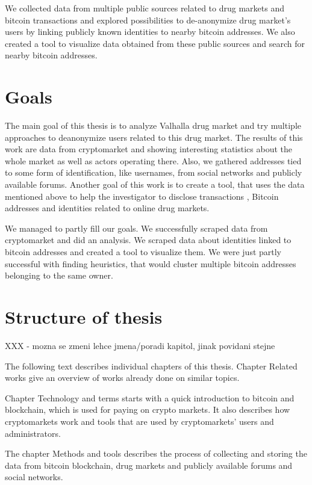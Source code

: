 \documentclass[
  digital, %
  table,   %
  lof,     %
  lot,     %
  oneside
]{fithesis3}
\begin{document}
We collected data from multiple public sources related to drug markets and bitcoin transactions and explored
 possibilities to de-anonymize drug market's users by linking publicly known identities to nearby bitcoin addresses.
We also created a tool to visualize data obtained from these public sources and search for nearby bitcoin addresses.

\section{Goals}

The main goal of this thesis is to analyze Valhalla drug market
and try multiple approaches to deanonymize users related to this drug market.
The results of this work are data from cryptomarket and
 showing interesting statistics about the whole market as well as actors operating there.
 Also, we gathered addresses tied to some form of identification, like usernames, from social networks and publicly available forums.
Another goal of this work is to create a tool, that uses the data mentioned above to help the investigator to disclose transactions
, Bitcoin addresses and identities related to online drug markets.

We managed to partly fill our goals. We successfully scraped data from cryptomarket and did an analysis.
We scraped data about identities linked to bitcoin addresses and created a tool to visualize them.
We were just partly successful with finding heuristics, that would cluster multiple bitcoin addresses belonging to the
same owner.

\section{Structure of thesis}
XXX - mozna se zmeni lehce jmena/poradi kapitol, jinak povidani stejne

The following text describes individual chapters of this thesis.
Chapter Related works give an overview of works already done on similar topics. 

Chapter Technology and terms starts with a quick introduction to bitcoin and blockchain,
which is used for paying on crypto markets.
It also describes how cryptomarkets work and tools that are used by cryptomarkets' users and administrators.

The chapter Methods and tools describes the process of collecting and storing the data from bitcoin blockchain,
drug markets and publicly available forums and social networks. 
\end{document}
